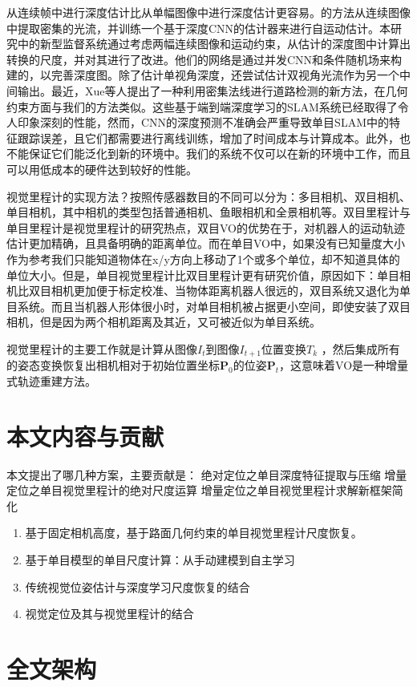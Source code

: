 从连续帧中进行深度估计比从单幅图像中进行深度估计更容易\cite{yang2019bayesian,eigen2015predicting}。\cite{Costante2015Exploring}的方法从连续图像中提取密集的光流，并训练一个基于深度CNN的估计器来进行自运动估计。本研究中的新型监督系统通过考虑两幅连续图像和运动约束，从估计的深度图中计算出转换的尺度，并对其进行了改进。他们的网络是通过并发CNN和条件随机场来构建的，以完善深度图。除了估计单视角深度，\cite{zhan2020visual}还尝试估计双视角光流作为另一个中间输出。最近，Xue等人\cite{xue2020toward}提出了一种利用密集法线进行道路检测的新方法，在几何约束方面与我们的方法类似。这些基于端到端深度学习的SLAM系统已经取得了令人印象深刻的性能，然而，CNN的深度预测不准确会严重导致单目SLAM中的特征跟踪误差，且它们都需要进行离线训练，增加了时间成本与计算成本。此外，也不能保证它们能泛化到新的环境中。我们的系统不仅可以在新的环境中工作，而且可以用低成本的硬件达到较好的性能。





视觉里程计的实现方法？按照传感器数目的不同可以分为：多目相机、双目相机、单目相机，其中相机的类型包括普通相机、鱼眼相机和全景相机等。双目里程计与单目里程计是视觉里程计的研究热点，双目VO的优势在于，对机器人的运动轨迹估计更加精确，且具备明确的距离单位。而在单目VO中，如果没有已知量度大小作为参考我们只能知道物体在x/y方向上移动了1个或多个单位，却不知道具体的单位大小。但是，单目视觉里程计比双目里程计更有研究价值，原因如下：单目相机比双目相机更加便于标定校准、当物体距离机器人很远的，双目系统又退化为单目系统。而且当机器人形体很小时，对单目相机被占据更小空间，即使安装了双目相机，但是因为两个相机距离及其近，又可被近似为单目系统。

视觉里程计的主要工作就是计算从图像$I_t$到图像$I_{t+1}$位置变换$T_k$ ，然后集成所有的姿态变换恢复出相机相对于初始位置坐标$\mathbf{P}_0$的位姿$\mathbf{P}_t$，这意味着VO是一种增量式轨迹重建方法。

\section{本文内容与贡献}
本文提出了哪几种方案，主要贡献是：
绝对定位之单目深度特征提取与压缩
增量定位之单目视觉里程计的绝对尺度运算
增量定位之单目视觉里程计求解新框架简化
\begin{enumerate}
	\item 基于固定相机高度，基于路面几何约束的单目视觉里程计尺度恢复。
	\item 基于单目模型的单目尺度计算：从手动建模到自主学习
	\item 传统视觉位姿估计与深度学习尺度恢复的结合
	\item 视觉定位及其与视觉里程计的结合
\end{enumerate}

\section{全文架构}
